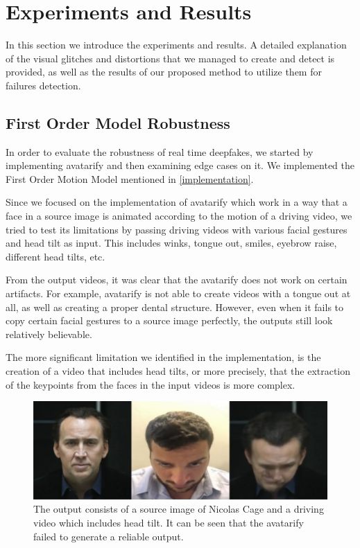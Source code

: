\documentclass[english,12pt]{article}
\begin{document}
\section{Experiments and Results} \label{experiments and results}

In this section we introduce the experiments and results. A detailed explanation of the
visual glitches and distortions that we managed to create and detect is provided, as well
as the results of our proposed method to utilize them for failures detection.

\subsection{First Order Model Robustness}

In order to evaluate the robustness of real time deepfakes, we started by implementing
avatarify and then examining edge cases on it. We implemented the First Order Motion Model
mentioned in \ref{implementation}.

Since we focused on the implementation of avatarify which work in a way that a face in a source
image is animated according to the motion of a driving video, we tried to test its limitations
by passing driving videos with various facial gestures and head tilt as input. This includes
winks, tongue out, smiles, eyebrow raise, different head tilts, etc.

From the output videos, it was clear that the avatarify does not work on certain artifacts.
For example, avatarify is not able to create videos with a tongue out at all, as well as
creating a proper dental structure. However, even when it fails to copy certain facial gestures
to a source image perfectly, the outputs still look relatively believable.

The more significant limitation we identified in the implementation, is the creation of a video
that includes head tilts, or more precisely, that the extraction of the keypoints from the faces
in the input videos is more complex.\\


\begin{figure}[htb]
  \begin{centering}
      \includegraphics[scale=0.25]{images/‏‏Amit_tilt1_cage.PNG}
  \par\end{centering}
  \caption{\label{fig:Amit_tilt1_cage}The output consists of a source image of Nicolas Cage and a driving video which includes head tilt. It can be seen that the avatarify failed to generate a reliable output.}
\end{figure}
\end{document}
